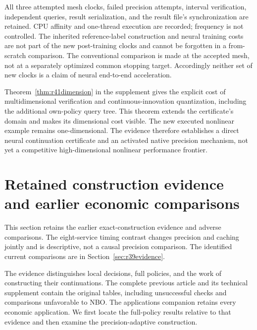 \documentclass[ecta,nameyear,draft]{econsocart}
\theoremstyle{definition}
\theoremstyle{remark}
\begin{document}
All three attempted mesh clocks, failed precision attempts, interval
verification, independent queries, result serialization, and the result
file's synchronization are retained. CPU affinity and one-thread execution
are recorded; frequency is not controlled. The inherited reference-label
construction and neural training costs are not part of the new
post-training clocks and cannot be forgotten in a from-scratch comparison.
The conventional comparison is made at the accepted mesh, not at a
separately optimized common stopping target. Accordingly neither set of
new clocks is a claim of neural end-to-end acceleration.

Theorem~\ref{thm:r41dimension} in the supplement gives the explicit cost of
multidimensional verification and continuous-innovation quantization,
including the additional own-policy query tree. This theorem extends the
certificate's domain and makes its dimensional cost visible. The new
executed nonlinear example remains one-dimensional. The evidence therefore
establishes a direct neural continuation certificate and an activated native
precision mechanism, not yet a competitive high-dimensional nonlinear
performance frontier.

\section{Retained construction evidence and earlier economic comparisons}\label{sec:r37evidence}
This section retains the earlier exact-construction evidence and adverse comparisons. The eight-service timing contrast changes precision and caching jointly and is descriptive, not a causal precision comparison. The identified current comparisons are in Section~\ref{sec:r39evidence}.

The evidence distinguishes local decisions, full policies, and the work of
constructing their continuations. The complete previous article and its
technical supplement contain the original tables, including unsuccessful
checks and comparisons unfavorable to NBO. The applications companion
retains every economic application. We first locate the full-policy results
relative to that evidence and then examine the precision-adaptive construction.
\end{document}
